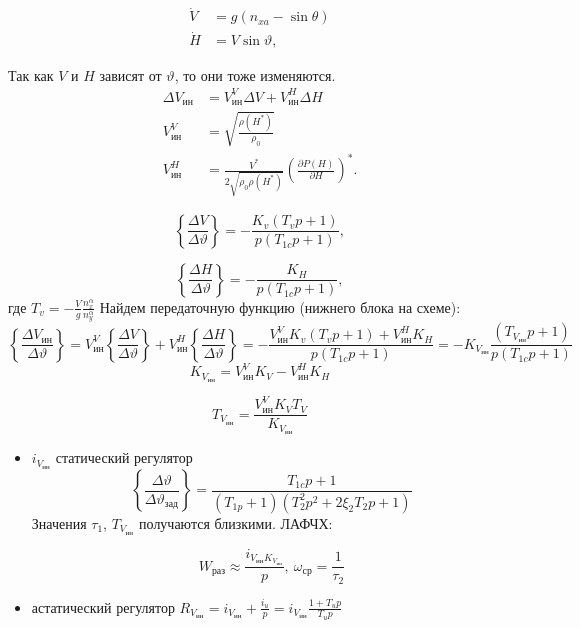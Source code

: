 \documentclass{article}
\begin{document}
\begin{align*}
	\dot{V} & = g(n_{xa} - \sin{\theta}) \\
	\dot{H} & = V \sin{\vartheta} ,
\end{align*}

Так как $V$ и $H$ зависят от $\vartheta$, то они тоже изменяются.
\begin{align*}
	\Delta V_\text{ин} & = V_\text{ин}^V \Delta V + V_\text{ин}^H \Delta H
	\\
	V_\text{ин}^V      & = \sqrt{\frac{\rho(H^*)}{\rho_0}}
	\\
	V_\text{ин}^H      & = \frac{V^*}{2 \sqrt{\rho_0 \rho(H^*)}} \left(
	\frac{\partial P(H)}{\partial H} \right)^*.
\end{align*}

\begin{figure}[H]
	\centering
	\label{fig:fig_47}
\end{figure}

\[
	\left\{ \frac{\Delta V}{\Delta \vartheta} \right\} = - \frac{K_v(T_v p +
		1)}{p(T_{1c} p + 1)},
\]

\[
	\left\{ \frac{\Delta H}{\Delta \vartheta} \right\} = - \frac{K_H}{p(T_{1c}
		p + 1)},
\]
где $T_v = -\frac{V}{g} \frac{n_x^\alpha}{ n_y^\alpha}$
Найдем передаточную функцию (нижнего блока на схеме):
\[
	\left\{ \frac{\Delta V_\text{ин}}{\Delta \vartheta} \right\} =
	V_\text{ин}^V \left\{ \frac{\Delta V}{\Delta \vartheta} \right\} +
	V_\text{ин}^H \left\{ \frac{\Delta H }{\Delta \vartheta} \right\} = -
	\frac{ V_\text{ин}^V K_v (T_v p + 1) + V_\text{ин}^H K_H}{p(T_{1c} p + 1)}
	= -K_{ V_\text{ин}} \frac{(T_{ V_\text{ин}} p + 1)}{p (T_{1c} p +1)}
\]
\[
	K_{ V_\text{ин}} = V_\text{ин}^V K_V  - V_\text{ин}^H K_H
\]

\[
	T_{ V_\text{ин}}  =\frac{ V_\text{ин}^V K_V T_V}{ K_{ V_\text{ин}}}
\]
\begin{itemize}
	\item  $i_{ V_\text{ин}}$ статический регулятор
	      \[
		      \left\{ \frac{\Delta \vartheta}{\Delta \vartheta_\text{зад}}
		      \right\} = \frac{T_{1c}p + 1}{ (T_{1p} + 1)( T_2^2 p^2 + 2 \xi_2
			      T_2p + 1) }
	      \]
	      Значения $\tau_1$, $T_{ V_\text{ин}}$ получаются близкими.
	      ЛАФЧХ:
	      \begin{figure}[H]
		      \centering
		      \label{fig:fig_56}
	      \end{figure}
	      \[
		      W_\text{раз} \approx \frac{i_{ V_\text{ин}K_{ V_\text{ин} }}}{p},
		      \ \omega_\text{ср} = \frac{1}{\tau_2}
	      \]
	\item астатический регулятор $R_{ V_\text{ин}} = i_{ V_\text{ин}} + \frac{
			      i_u}{p} = i_{ V_\text{ин} } \frac{1 + T_u p }{T_u p}$
\end{itemize}
\end{document}
